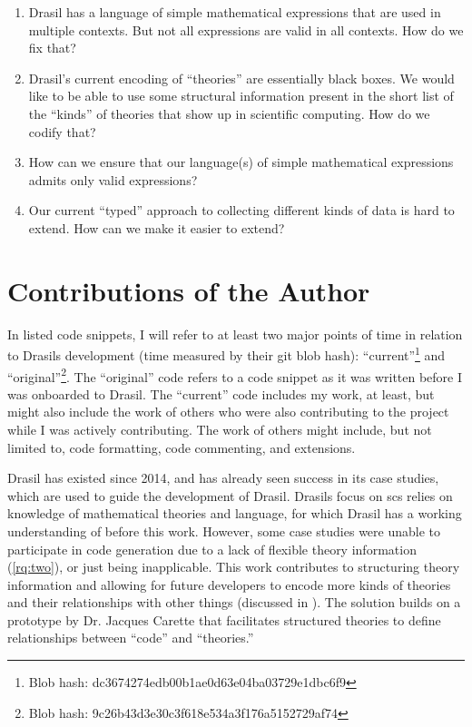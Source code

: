 \begin{enumerate}

      \item[\namedlabel{rq:one}{RQ1}] Drasil has a language of simple
            mathematical expressions that are used in multiple contexts. But not
            all expressions are valid in all contexts. How do we fix that?

      \item[\namedlabel{rq:two}{RQ2}] Drasil's current encoding of ``theories''
            are essentially black boxes. We would like to be able to use some
            structural information present in the short list of the ``kinds'' of
            theories that show up in scientific computing. How do we codify
            that?

      \item[\namedlabel{rq:three}{RQ3}] How can we ensure that our language(s)
            of simple mathematical expressions admits only valid expressions?

      \item[\namedlabel{rq:four}{RQ4}] Our current ``typed'' approach to
            collecting different kinds of data is hard to extend. How can we
            make it easier to extend?

\end{enumerate}

\section{Contributions of the Author}
\label{sec:intro:contributions}

In listed code snippets, I will refer to at least two major points of time in
relation to Drasils development (time measured by their git blob hash):
``current''\footnote{Blob hash: dc3674274edb00b1ae0d63e04ba03729e1dbc6f9} and
``original''\footnote{Blob hash: 9c26b43d3e30c3f618e534a3f176a5152729af74}. The
``original'' code refers to a code snippet as it was written before I was
onboarded to Drasil. The ``current'' code includes my work, at least, but might
also include the work of others who were also contributing to the project while
I was actively contributing. The work of others might include, but not limited
to, code formatting, code commenting, and extensions.

Drasil has existed since 2014, and has already seen success in its case studies,
which are used to guide the development of Drasil. Drasils focus on \acs{scs}
relies on knowledge of mathematical theories and language, for which Drasil has
a working understanding of before this work. However, some case studies were
unable to participate in code generation due to a lack of flexible theory
information (\ref{rq:two}), or just being inapplicable. This work contributes to
structuring theory information and allowing for future developers to encode more
kinds of theories and their relationships with other things (discussed in
). The solution builds on a prototype by Dr. Jacques
Carette that facilitates
structured theories to define relationships between ``code'' and ``theories.''

